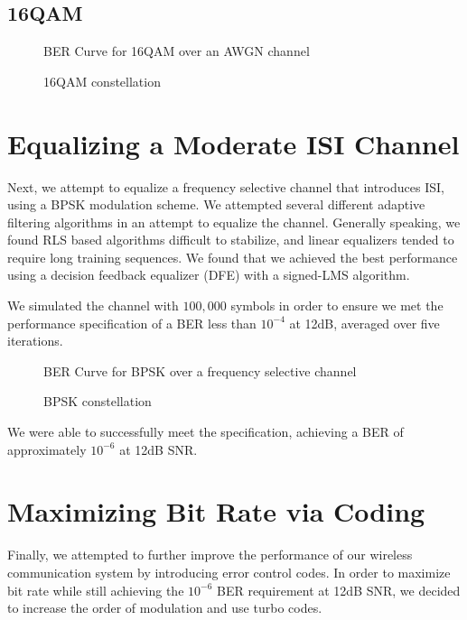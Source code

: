 \documentclass[conference]{IEEEtran}
\begin{document}
\subsection{16QAM}
\begin{figure}[htbp]
\caption{BER Curve for 16QAM over an AWGN channel}
\label{16ber}
\end{figure}
\begin{figure}[htbp]
\caption{16QAM constellation}
\label{16star}
\end{figure}

\section{Equalizing a Moderate ISI Channel}
Next, we attempt to equalize a frequency selective channel that introduces ISI, using a BPSK modulation scheme. We attempted several different adaptive filtering algorithms in an attempt to equalize the channel. Generally speaking, we found RLS based algorithms difficult to stabilize, and linear equalizers tended to require long training sequences. We found that we achieved the best performance using a decision feedback equalizer (DFE) with a signed-LMS algorithm.

We simulated the channel with $100,000$ symbols in order to ensure we met the performance specification of a BER less than $10^{-4}$ at 12dB, averaged over five iterations. 
\begin{figure}[htbp]
\caption{BER Curve for BPSK over a frequency selective channel}
\label{16ber}
\end{figure}
\begin{figure}[htbp]
\caption{BPSK constellation}
\label{16star}
\end{figure}
We were able to successfully meet the specification, achieving a BER of approximately $10^{-6}$ at 12dB SNR.
\section{Maximizing Bit Rate via Coding}
Finally, we attempted to further improve the performance of our wireless communication system by introducing error control codes. In order to maximize bit rate while still achieving the $10^{-6}$ BER requirement at 12dB SNR, we decided to increase the order of modulation and use turbo codes. 
\end{document}
